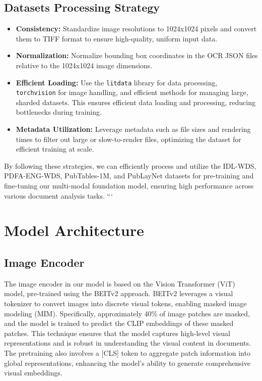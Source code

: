 \documentclass{article}
\begin{document}
\subsection{Datasets Processing Strategy}

\begin{itemize}
    \item \textbf{Consistency:} Standardize image resolutions to 1024x1024 pixels and convert them to TIFF format to ensure high-quality, uniform input data.
    \item \textbf{Normalization:} Normalize bounding box coordinates in the OCR JSON files relative to the 1024x1024 image dimensions.
    \item \textbf{Efficient Loading:} Use the \texttt{litdata} library for data processing, \texttt{torchvision} for image handling, and efficient methods for managing large, sharded datasets. This ensures efficient data loading and processing, reducing bottlenecks during training.
    \item \textbf{Metadata Utilization:} Leverage metadata such as file sizes and rendering times to filter out large or slow-to-render files, optimizing the dataset for efficient training at scale.
\end{itemize}

By following these strategies, we can efficiently process and utilize the IDL-WDS, PDFA-ENG-WDS, PubTables-1M, and PubLayNet datasets for pre-training and fine-tuning our multi-modal foundation model, ensuring high performance across various document analysis tasks.
```

\section{Model Architecture}

\subsection{Image Encoder}

The image encoder in our model is based on the Vision Transformer (ViT) model, pre-trained using the BEITv2 approach. BEITv2 leverages a visual tokenizer to convert images into discrete visual tokens, enabling masked image modeling (MIM). Specifically, approximately 40\% of image patches are masked, and the model is trained to predict the CLIP embeddings of these masked patches. This technique ensures that the model captures high-level visual representations and is robust in understanding the visual content in documents. The pretraining also involves a [CLS] token to aggregate patch information into global representations, enhancing the model’s ability to generate comprehensive visual embeddings.
\end{document}
